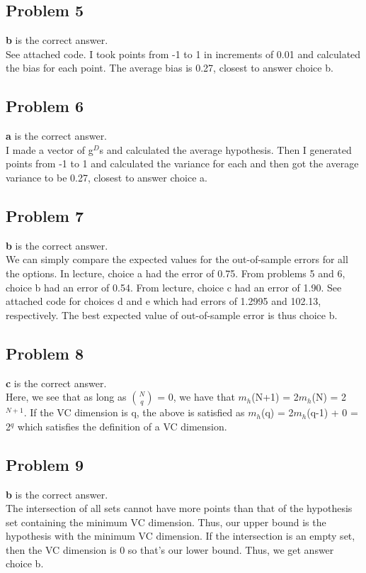 \documentclass[12 pt]{article}
\begin{document}
	\subsection*{Problem 5}
	\textbf{b} is the correct answer.\\
	See attached code. I took points from -1 to 1 in increments of 0.01 and calculated the bias for each point. The average bias is 0.27, closest to answer choice b.

		
	\subsection*{Problem 6}
	\textbf{a} is the correct answer. \\
	I made a vector of g$^{D}$s and calculated the average hypothesis. Then I generated points from -1 to 1 and calculated the variance for each and then got the average variance to be 0.27, closest to answer choice a.

		
	\subsection*{Problem 7}
	\textbf{b} is the correct answer. \\
	We can simply compare the expected values for the out-of-sample errors for all the options. In lecture, choice a had the error of 0.75. From problems 5 and 6, choice b had an error of 0.54. From lecture, choice c had an error of 1.90. See attached code for choices d and e which had errors of 1.2995 and 102.13, respectively. The best expected value of out-of-sample error is thus choice b.

		
	
	\subsection*{Problem 8}
	\textbf{c} is the correct answer. \\
	Here, we see that as long as $\binom{N}{q}$ = 0, we have that $m_h$(N+1) = 2$m_h$(N) = 2$^{N+1}$. If the VC dimension is q, the above is satisfied as $m_h$(q) = 2$m_h$(q-1) + 0 = 2$^q$ which satisfies the definition of a VC dimension.
	

	
	\subsection*{Problem 9}
	\textbf{b} is the correct answer. \\
	The intersection of all sets cannot have more points than that of the hypothesis set containing the minimum VC dimension. Thus, our upper bound is the hypothesis with the minimum VC dimension. If the intersection is an empty set, then the VC dimension is 0 so that's our lower bound. Thus, we get answer choice b.
\end{document}

